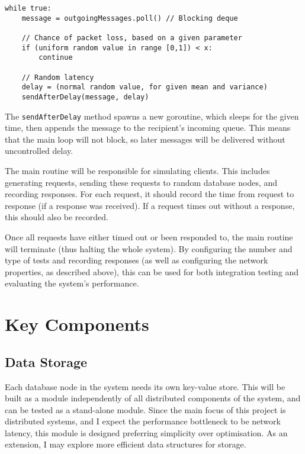 \documentclass[12pt,a4paper]{article}
\begin{document}
\begin{lstlisting}
while true:
    message = outgoingMessages.poll() // Blocking deque

    // Chance of packet loss, based on a given parameter
    if (uniform random value in range [0,1]) < x:
        continue

    // Random latency
    delay = (normal random value, for given mean and variance)
    sendAfterDelay(message, delay)
\end{lstlisting}

The \verb|sendAfterDelay| method spawns a new goroutine, which sleeps for the given time, then appends the message to the recipient's incoming queue. This means that the main loop will not block, so later messages will be delivered without uncontrolled delay.

The main routine will be responsible for simulating clients. This includes generating requests, sending these requests to random database nodes, and recording responses. For each request, it should record the time from request to response (if a response was received). If a request times out without a response, this should also be recorded.

Once all requests have either timed out or been responded to, the main routine will terminate (thus halting the whole system). By configuring the number and type of tests and recording responses (as well as configuring the network properties, as described above), this can be used for both integration testing and evaluating the system's performance.


\section*{Key Components}

\subsection*{Data Storage}

Each database node in the system needs its own key-value store. This will be built as a module independently of all distributed components of the system, and can be tested as a stand-alone module. Since the main focus of this project is distributed systems, and I expect the performance bottleneck to be network latency, this module is designed preferring simplicity over optimisation. As an extension, I may explore more efficient data structures for storage.
\end{document}
